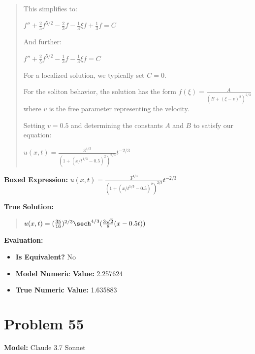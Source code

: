 \documentclass{article}
\begin{document}
\begin{quote}
This simplifies to:

$f'' + \frac{2}{5}f^{5/2} - \frac{2}{3}f - \frac{1}{3}\xi f + \frac{1}{3}f = C$



And further:

$f'' + \frac{2}{5}f^{5/2} - \frac{1}{3}f - \frac{1}{3}\xi f = C$



For a localized solution, we typically set $C=0$.



For the soliton behavior, the solution has the form $f(\xi) = \frac{A}{(B+(\xi-v)^2)^{2/3}}$ where $v$ is the free parameter representing the velocity.



Setting $v=0.5$ and determining the constants $A$ and $B$ to satisfy our equation:



$\boxed{u(x,t) = \frac{3^{4/3}}{(1+(x/t^{1/3}-0.5)^2)^{2/3}}t^{-2/3}}$
\end{quote}
\textbf{Boxed Expression:} $u(x,t) = \frac{3^{4/3}}{(1+(x/t^{1/3}-0.5)^2)^{2/3}}t^{-2/3}$

\textbf{True Solution:}
\begin{quote}
$u(x,t) = ( \frac{35}{16} )^{2/3} \sech^{4/3}( \frac{3\sqrt{2}}{8}(x - 0.5t) )$
\end{quote}

\textbf{Evaluation:}
\begin{itemize}
\item \textbf{Is Equivalent?} No
\item \textbf{Model Numeric Value:} 2.257624
\item \textbf{True Numeric Value:} 1.635883
\end{itemize}
\vspace{1cm}
\section*{Problem 55}
\textbf{Model:} Claude 3.7 Sonnet
\end{document}
